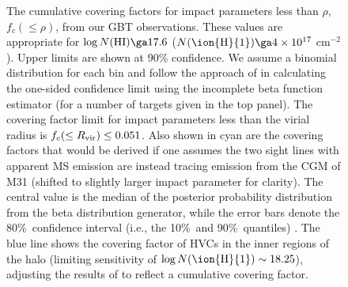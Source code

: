 \documentclass[12pt,preprint]{aastex6}
\newcommand{\virialCovering}{0.051}
\newcommand{\HI}{\ensuremath{\mbox{\ion{H}{1}}}}
\newcommand{\logNHI}{\ensuremath{\log N(\mbox{\ion{H}{1}})}\relax}
\newcommand{\Rvir}{\ensuremath{R_{\rm vir}}\relax}
\newcommand{\column}{cm$^{-2}$}
\newcommand{\fccum}{\ensuremath{f_c(\le \rho)}\relax}
\begin{document}
\begin{figure}
  \caption{The cumulative covering factors for impact parameters less
    than $\rho$, \fccum, from our GBT observations. These values are
    appropriate for $\log N({\rm H I}) \ga 17.6$
    ($N(\mbox{\HI}) \ga 4\times10^{17}$ \column). Upper limits are
    shown at 90\% confidence. We assume a binomial distribution for
    each bin and follow the approach of \citet{cameron2011} in
    calculating the one-sided confidence limit using the incomplete
    beta function estimator (for a number of targets given in the top
    panel). The covering factor limit for impact parameters less than
    the virial radius is $f_c(\le \Rvir) \le \virialCovering$. Also
    shown in cyan are the covering factors that would be derived if
    one assumes the two sight lines with apparent MS emission are
    instead tracing emission from the CGM of M31 (shifted to slightly
    larger impact parameter for clarity). The central value is the
    median of the posterior probability distribution from the beta
    distribution generator, while the error bars denote the 80\%\
    confidence interval (i.e., the 10\%\ and 90\%\ quantiles)
    \citep{cameron2011}. The blue line shows the covering factor of
    HVCs in the inner regions of the halo (limiting sensitivity of
    $\logNHI \sim 18.25$), adjusting the results of
    \citet{richter2012} to reflect a cumulative covering
    factor. \label{fig:coveringfactor}}
%
\end{figure}
\end{document}
